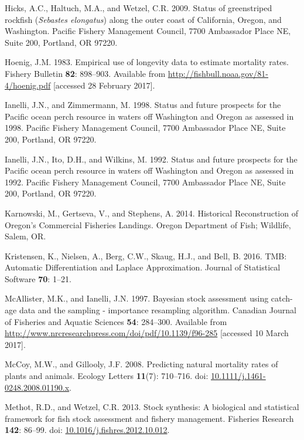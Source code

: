 \documentclass[12pt,]{article}
\begin{document}
\hypertarget{ref-hicks_status_2009}{}
Hicks, A.C., Haltuch, M.A., and Wetzel, C.R. 2009. Status of
greenstriped rockfish (\emph{Sebastes elongatus}) along the outer coast
of California, Oregon, and Washington. Pacific Fishery Management
Council, 7700 Ambassador Place NE, Suite 200, Portland, OR 97220.

\hypertarget{ref-hoenig_empirical_1983}{}
Hoenig, J.M. 1983. Empirical use of longevity data to estimate mortality
rates. Fishery Bulletin \textbf{82}: 898--903. Available from
\url{http://fishbull.noaa.gov/81-4/hoenig.pdf} {[}accessed 28 February
2017{]}.

\hypertarget{ref-ianelli_status_1998}{}
Ianelli, J.N., and Zimmermann, M. 1998. Status and future prospects for
the Pacific ocean perch resource in waters off Washington and Oregon as
assessed in 1998. Pacific Fishery Management Council, 7700 Ambassador
Place NE, Suite 200, Portland, OR 97220.

\hypertarget{ref-ianelli_status_1992}{}
Ianelli, J.N., Ito, D.H., and Wilkins, M. 1992. Status and future
prospects for the Pacific ocean perch resource in waters off Washington
and Oregon as assessed in 1992. Pacific Fishery Management Council, 7700
Ambassador Place NE, Suite 200, Portland, OR 97220.

\hypertarget{ref-karnowski_historical_2014}{}
Karnowski, M., Gertseva, V., and Stephens, A. 2014. Historical
Reconstruction of Oregon's Commercial Fisheries Landings. Oregon
Department of Fish; Wildlife, Salem, OR.

\hypertarget{ref-kristensen_tmb:_2016}{}
Kristensen, K., Nielsen, A., Berg, C.W., Skaug, H.J., and Bell, B. 2016.
TMB: Automatic Differentiation and Laplace Approximation. Journal of
Statistical Software \textbf{70}: 1--21.

\hypertarget{ref-mcallister_bayesian_1997}{}
McAllister, M.K., and Ianelli, J.N. 1997. Bayesian stock assessment
using catch-age data and the sampling - importance resampling algorithm.
Canadian Journal of Fisheries and Aquatic Sciences \textbf{54}:
284--300. Available from
\url{http://www.nrcresearchpress.com/doi/pdf/10.1139/f96-285}
{[}accessed 10 March 2017{]}.

\hypertarget{ref-mccoy_predicting_2008}{}
McCoy, M.W., and Gillooly, J.F. 2008. Predicting natural mortality rates
of plants and animals. Ecology Letters \textbf{11}(7): 710--716. doi:
\href{https://doi.org/10.1111/j.1461-0248.2008.01190.x}{10.1111/j.1461-0248.2008.01190.x}.

\hypertarget{ref-methot_stock_2013}{}
Methot, R.D., and Wetzel, C.R. 2013. Stock synthesis: A biological and
statistical framework for fish stock assessment and fishery management.
Fisheries Research \textbf{142}: 86--99. doi:
\href{https://doi.org/10.1016/j.fishres.2012.10.012}{10.1016/j.fishres.2012.10.012}.
\end{document}
